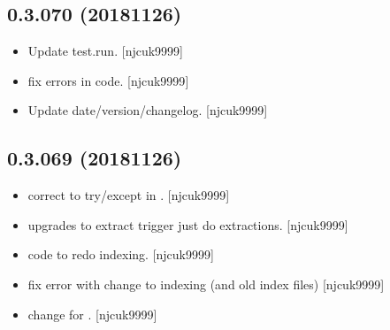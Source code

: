 \documentclass[a4paper,10pt,english]{report}
\begin{document}
\subsection{0.3.070 (2018\sphinxhyphen{}11\sphinxhyphen{}26)}
\label{\detokenize{misc/changelog:id271}}\begin{itemize}
\item {} 
Update test.run. {[}njcuk9999{]}

\item {} 
 \sphinxhyphen{} fix errors in code. {[}njcuk9999{]}

\item {} 
Update date/version/changelog. {[}njcuk9999{]}

\end{itemize}


\subsection{0.3.069 (2018\sphinxhyphen{}11\sphinxhyphen{}26)}
\label{\detokenize{misc/changelog:id272}}\begin{itemize}
\item {} 
 \sphinxhyphen{} correct to try/except in .
{[}njcuk9999{]}

\item {} 
 \sphinxhyphen{} upgrades to extract trigger just do extractions.
{[}njcuk9999{]}

\item {} 
 \sphinxhyphen{} code to redo indexing. {[}njcuk9999{]}

\item {} 
 \sphinxhyphen{} fix error with change to indexing (and old index
files) {[}njcuk9999{]}

\item {} 
 \sphinxhyphen{} change  for .
{[}njcuk9999{]}

\end{itemize}
\end{document}
